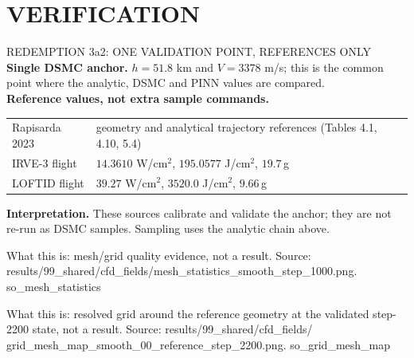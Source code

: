 \documentclass[aspectratio=169,11pt]{beamer}
\begin{document}
\section{VERIFICATION}
\begin{frame}{REDEMPTION 3a2: ONE VALIDATION POINT, REFERENCES ONLY}
  \small
  \textbf{Single DSMC anchor.} $h=51.8$ km and $V=3378$ m/s; this is the
  common point where the analytic, DSMC and PINN values are compared.\\
  \textbf{Reference values, not extra sample commands.}
  \begin{tabular}{@{}p{3.1cm}p{9.0cm}@{}}
  Rapisarda 2023 & geometry and analytical trajectory references (Tables 4.1, 4.10, 5.4)\\
  IRVE-3 flight & $14.3610$ W/cm$^2$, $195.0577$ J/cm$^2$, $19.7$\,g\\
  LOFTID flight & $39.27$ W/cm$^2$, $3520.0$ J/cm$^2$, $9.66$\,g\\
  \end{tabular}
  \vspace{0.2cm}
  \textbf{Interpretation.} These sources calibrate and validate the anchor; they
  are not re-run as DSMC samples. Sampling uses the analytic chain above.
\end{frame}

  {%
   What this is: mesh/grid quality evidence, not a result.
   Source: results/99\_shared/cfd\_fields/mesh\_statistics\_smooth\_step\_1000.png.}
  {so_mesh_statistics}

  {%
   What this is: resolved grid around the reference geometry at the validated
   step-2200 state, not a result. Source: results/99\_shared/cfd\_fields/
   grid\_mesh\_map\_smooth\_00\_reference\_step\_2200.png.}
  {so_grid_mesh_map}
\end{document}
